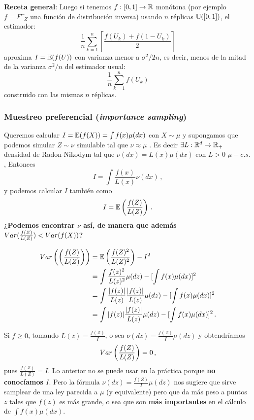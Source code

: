 \textbf{Receta general}: Luego si tenemos $f:[0,1]\to\mathbb{R}$ monótona (por ejemplo $f=F^-_{\mbox{ }Z}$ una función de distribución inversa) usando $n$ réplicas $\mathbb{U}([0,1])$, el estimador: $$\displaystyle\frac{1}{n}\sum^n_{k=1}[\frac{f(U_k)+f(1-U_k)}{2}]$$ aproxima $I=\mathbb{E}(f(U))$ con varianza menor a $\sigma^2/2n$, es decir, menos de la mitad de la varianza $\sigma^2/n$ del estimador usual: $$\displaystyle\frac{1}{n}\sum^n_{k=1}f(U_k)$$ construido con las mismas $n$ réplicas.

\subsubsection{Muestreo preferencial (\textit{importance sampling})}
\label{preferencial}
Queremos calcular $I=\mathbb{E}(f(X))=\int f(x)\mu(dx)$ con $X\sim \mu$ y supongamos que podemos simular $Z\sim\nu$ simulable tal que $\nu\approx\mu$ .  %
Es decir $\exists L:\mathbb{R}^d\to\mathbb{R}_+$ densidad de Radon-Nikodym tal que $\nu(dx)=L(x)\mu(dx)$ con $L>0$ $\mu-c.s.$,
\newline Entonces 
$$I=\displaystyle\int\frac{f(x)}{L(x)}\nu(dx)\, ,$$ 
y podemos calcular $I$ también como 
$$I=\displaystyle\mathbb{E}\left(\frac{f(Z)}{L(Z)}\right) \, .$$
\textbf{¿Podemos encontrar $\nu$ así, de manera que además $Var(\frac{f(Z)}{L(Z)})<Var(f(X))$?}
\begin{remark}
\begin{alignat*}{2}
    Var\left(\displaystyle\left(\frac{f(Z)}{L(Z)}\right)\right) & = \mathbb{E}\left(\frac{f(Z)^2}{L(Z)^2}\right)-I^2\\
     & = \int \frac{f(z)^2}{L(z)^2}\mu(dz) - [\int f(x)\mu(dx)]^2 \\
     & = \int \frac{|f(z)|}{L(z)}\frac{|f(z)|}{L(z)}\mu(dz) - [\int f(x)\mu(dx)]^2 \\
     & = \int |f(z)|\frac{|f(z)|}{L(z)}\mu(dz) - [\int f(x)\mu(dx)]^2 \, .
\end{alignat*}
\end{remark}
Si $f\geq0$, tomando $L(z)=\displaystyle\frac{f(Z)}{I}$, o sea $\nu(dz)=\displaystyle\frac{f(Z)}{I}\mu(dz)$ y obtendríamos 
$$Var\left(\frac{f(Z)}{L(Z)}\right)=0 \, ,$$
pues $\frac{f(Z)}{L(Z)}=I$.
\newp Lo anterior no se puede usar en la práctica porque \textbf{no conocíamos $I$}. Pero la fórmula $\nu(dz)=\frac{f(Z)}{I}\mu(dz)$ nos sugiere que sirve samplear de una ley parecida a $\mu$ (y equivalente) pero que da más peso a puntos $z$ tales que $f(z)$ es más grande, o sea que son \textbf{más importantes} en el cálculo de $\int f(x)\mu(dx)$.

